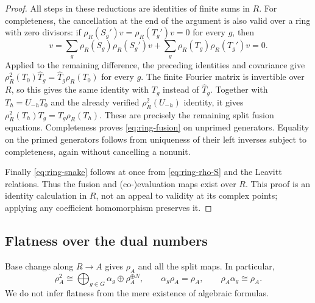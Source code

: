 \documentclass[11pt]{article}
\theoremstyle{remark}
\begin{document}
\begin{proof}
All steps in these reductions are identities of finite sums in $R$.
For completeness, the cancellation at the end of the argument is also
valid over a ring with zero divisors: if
$\rho_R(S_g')v=\rho_R(T_g')v=0$ for every $g$, then
\[
 v=\sum_g\rho_R(S_g)\rho_R(S_g')v+
          \sum_g\rho_R(T_g)\rho_R(T_g')v=0.
\]
Applied to the remaining difference, the preceding identities and
covariance give
$\rho_R^2(T_0)\widehat T_g=\widehat T_g\rho_R(T_0)$ for every $g$.
The finite Fourier matrix is invertible over $R$, so this gives the same
identity with $T_g$ instead of $\widehat T_g$. Together with
$T_h=U_{-h}T_0$ and the already verified $\rho_R^2(U_{-h})$ identity,
it gives
$\rho_R^2(T_h)T_g=T_g\rho_R(T_h)$. These are precisely the remaining
split fusion equations. Completeness proves \eqref{eq:ring-fusion} on
unprimed generators. Equality on the primed generators follows from
uniqueness of their left inverses subject to completeness, again without
cancelling a nonunit.

Finally \eqref{eq:ring-snake} follows at once from
\eqref{eq:ring-rho-S} and the Leavitt relations. Thus the fusion and
(co-)evaluation maps exist over $R$. This proof is an identity calculation
in $R$, not an appeal to validity at its complex points; applying any
coefficient homomorphism preserves it.
\end{proof}

\subsection{Flatness over the dual numbers}
Base change along $R\to A$ gives $\rho_A$ and all the split maps.
In particular,
\begin{equation}\label{eq:split-fusion-A}
 \rho_A^2\cong\bigoplus_{g\in G}\alpha_g\oplus\rho_A^{\oplus N},
 \qquad\alpha_g\rho_A=\rho_A,\qquad\rho_A\alpha_g\cong\rho_A.
\end{equation}
We do not infer flatness from the mere existence of algebraic formulas.
\end{document}
